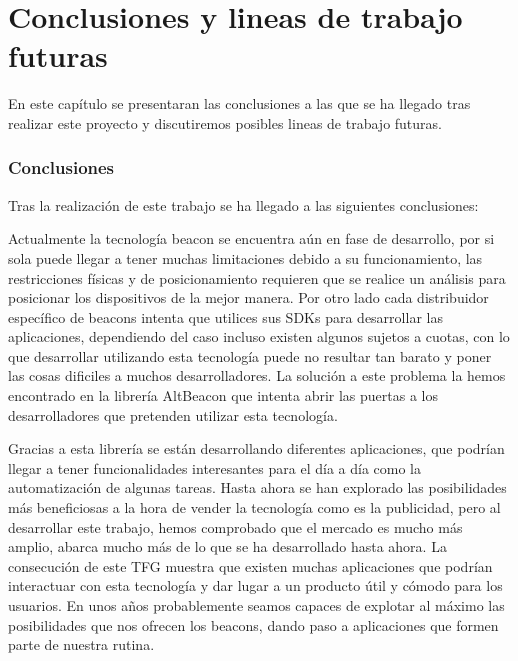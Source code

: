 %
%
%

\chapter{Conclusiones y lineas de trabajo futuras} \label{chap:Conclusiones} 

En este capítulo se presentaran las conclusiones a las que se ha llegado tras realizar este proyecto y discutiremos posibles lineas de trabajo futuras.

\subsection{Conclusiones}

Tras la realización de este trabajo se ha llegado a las siguientes conclusiones: 


Actualmente la tecnología beacon se encuentra aún en fase de desarrollo, por si sola puede llegar a tener muchas limitaciones debido a su funcionamiento, las restricciones físicas y de posicionamiento requieren que se realice un análisis para posicionar los dispositivos de la mejor manera. Por otro lado cada distribuidor específico de beacons intenta que utilices sus SDKs para desarrollar las aplicaciones, dependiendo del caso incluso existen algunos sujetos a cuotas, con lo que desarrollar utilizando esta tecnología puede no resultar tan barato y poner las cosas dificiles a muchos desarrolladores. La solución a este problema la hemos encontrado en la librería AltBeacon que intenta abrir las puertas a los desarrolladores que pretenden utilizar esta tecnología.


Gracias a esta librería se están desarrollando diferentes aplicaciones, que podrían llegar a tener funcionalidades interesantes para el día a día como la automatización de algunas tareas. Hasta ahora se han explorado las posibilidades más beneficiosas a la hora de vender la tecnología como es la publicidad, pero al desarrollar este trabajo, hemos comprobado que el mercado es mucho más amplio, abarca mucho más de lo que se ha desarrollado hasta ahora. La consecución de este TFG muestra que existen muchas aplicaciones que podrían interactuar con esta tecnología y dar lugar a un producto útil y cómodo para los usuarios. En unos años probablemente seamos capaces de explotar al máximo las posibilidades que nos ofrecen los beacons, dando paso a aplicaciones que formen parte de nuestra rutina.


